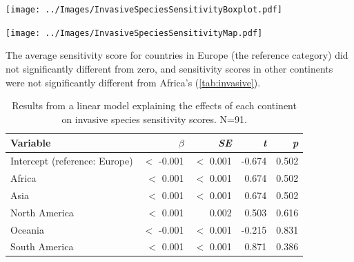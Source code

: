 \documentclass[11pt, a4paper, titlepage]{article}
\begin{document}
	\begin{center}
		
		\texttt{[image: ../Images/InvasiveSpeciesSensitivityBoxplot.pdf]}
		\label{invasivebox}
		
		\texttt{[image: ../Images/InvasiveSpeciesSensitivityMap.pdf]}
		\label{invasivemap}
		

	\end{center}

    The average sensitivity score for countries in Europe (the reference category) did not significantly different from zero, and sensitivity scores in other continents were not significantly different from Africa's (\autoref{tab:invasive}). 
    
    
	\begin{table}[H]
		\begin{center}
			\caption{Results from a linear model explaining the effects of each continent on invasive species sensitivity scores.\textmd{ N=91.}}
			\label{tab:invasive}
			\begin{tabular}{l|r|r|r|r} %
				Variable & $\beta$ & \textit{SE} & \textit{t} & \textit{p}\\
				\hline
				Intercept (reference: Europe) & $<$ -0.001 & $<$ 0.001 & -0.674 & 0.502\\
				Africa & $<$ 0.001 & $<$ 0.001 & 0.674 & 0.502\\
				Asia & $<$ 0.001 & $<$ 0.001 & 0.674 & 0.502 \\
				North America & $<$ 0.001 & 0.002 & 0.503 & 0.616\\
				Oceania & $<$ -0.001 & $<$ 0.001 & -0.215 & 0.831\\
				South America & $<$ 0.001 & $<$ 0.001 & 0.871 & 0.386\\
				
			\end{tabular}
		\end{center}
	\end{table}
\end{document}
